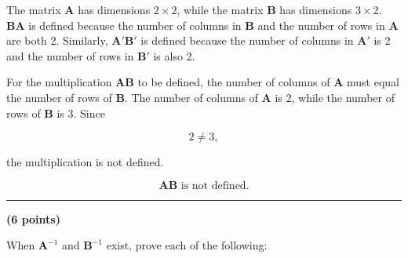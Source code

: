 \documentclass[12pt]{article}
\begin{document}
\begin{enumerate}
\noindent The matrix $\mathbf{A}$ has dimensions $2\times2$, while the matrix $\mathbf{B}$ has dimensions $3\times2$. $\mathbf{B}\mathbf{A}$ is defined because the number of columns in $\mathbf{B}$ and the number of rows in $\mathbf{A}$ are both 2. Similarly, $\mathbf{A}'\mathbf{B}'$ is defined because the number of columns in $\mathbf{A}'$ is 2 and the number of rows in $\mathbf{B}'$ is also 2.

\noindent For the multiplication $\mathbf{A}\mathbf{B}$ to be defined, the number of columns of $\mathbf{A}$ must equal the number of rows of $\mathbf{B}$. The number of columns of $\mathbf{A}$ is $2$, while the number of rows of $\mathbf{B}$ is $3$. Since

$$
2\neq3,
$$

\noindent the multiplication is not defined.

$$
\boxed{\mathbf{A}\mathbf{B}\text{ is not defined.}}
$$

\end{enumerate}

\vspace{2em}

\noindent\rule{\textwidth}{0.4pt}

\vspace{2em}

 \hfill {\large \textbf{(6 points)}}

\vspace{1em}

\noindent When $\mathbf{A}^{-1}$ and $\mathbf{B}^{-1}$ exist, prove each of the following:
\end{document}
